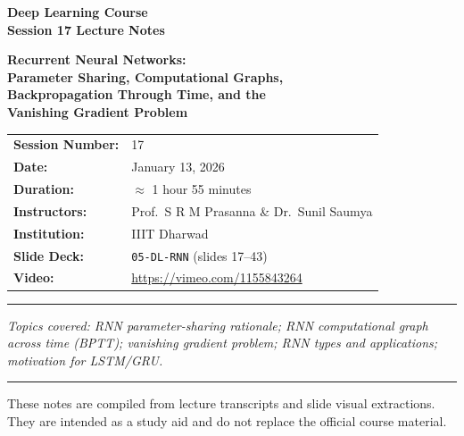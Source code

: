 \documentclass[12pt,a4paper]{article}
\begin{document}

\begin{titlepage}
  \centering
  \vspace*{2cm}
  {\LARGE\bfseries Deep Learning Course\\[0.4em]
   Session 17 Lecture Notes\par}
  \vspace{1.5cm}
  {\large\bfseries Recurrent Neural Networks:\\
  Parameter Sharing, Computational Graphs,\\
  Backpropagation Through Time, and the\\
  Vanishing Gradient Problem\par}
  \vspace{1.5cm}
  \begin{tabular}{ll}
    \textbf{Session Number:} & 17 \\[0.3em]
    \textbf{Date:}           & January 13, 2026 \\[0.3em]
    \textbf{Duration:}       & $\approx$ 1 hour 55 minutes \\[0.3em]
    \textbf{Instructors:}    & Prof.\ S R M Prasanna \& Dr.\ Sunil Saumya \\[0.3em]
    \textbf{Institution:}    & IIIT Dharwad \\[0.3em]
    \textbf{Slide Deck:}     & \texttt{05-DL-RNN} (slides 17--43) \\[0.3em]
    \textbf{Video:}          & \url{https://vimeo.com/1155843264} \\
  \end{tabular}
  \vspace{2cm}
  \hrule
  \vspace{0.5cm}
  {\itshape Topics covered: RNN parameter-sharing rationale; RNN computational
  graph across time (BPTT); vanishing gradient problem; RNN types and
  applications; motivation for LSTM/GRU.\par}
  \vspace{0.5cm}
  \hrule
  \vfill
  {\small These notes are compiled from lecture transcripts and slide visual
  extractions.  They are intended as a study aid and do not replace the
  official course material.}
\end{titlepage}

\tableofcontents
\newpage
\end{document}
